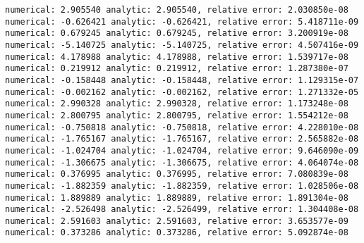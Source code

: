 \documentclass[11pt]{article}
\begin{document}
    \begin{Verbatim}[commandchars=\\\{\}]
numerical: 2.905540 analytic: 2.905540, relative error: 2.030850e-08
numerical: -0.626421 analytic: -0.626421, relative error: 5.418711e-09
numerical: 0.679245 analytic: 0.679245, relative error: 3.200919e-08
numerical: -5.140725 analytic: -5.140725, relative error: 4.507416e-09
numerical: 4.178988 analytic: 4.178988, relative error: 1.539717e-08
numerical: 0.219912 analytic: 0.219912, relative error: 1.287380e-07
numerical: -0.158448 analytic: -0.158448, relative error: 1.129315e-07
numerical: -0.002162 analytic: -0.002162, relative error: 1.271332e-05
numerical: 2.990328 analytic: 2.990328, relative error: 1.173248e-08
numerical: 2.800795 analytic: 2.800795, relative error: 1.554212e-08
numerical: -0.750818 analytic: -0.750818, relative error: 4.228010e-08
numerical: -1.765167 analytic: -1.765167, relative error: 2.565882e-08
numerical: -1.024704 analytic: -1.024704, relative error: 9.646090e-09
numerical: -1.306675 analytic: -1.306675, relative error: 4.064074e-08
numerical: 0.376995 analytic: 0.376995, relative error: 7.080839e-08
numerical: -1.882359 analytic: -1.882359, relative error: 1.028506e-08
numerical: 1.889889 analytic: 1.889889, relative error: 1.891304e-08
numerical: -2.526498 analytic: -2.526499, relative error: 1.304408e-08
numerical: 2.591603 analytic: 2.591603, relative error: 3.653577e-09
numerical: 0.373286 analytic: 0.373286, relative error: 5.092874e-08

    \end{Verbatim}
\end{document}
